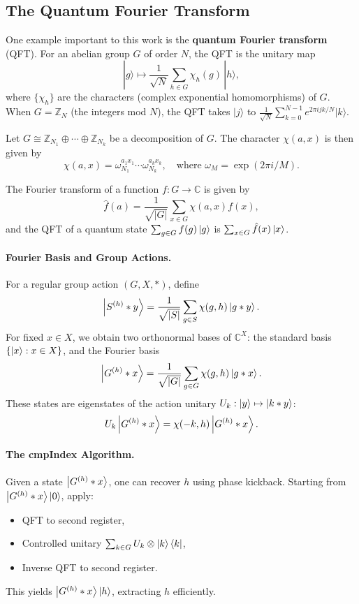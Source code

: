 \documentclass[12pt]{report}
\begin{document}
\subsection{The Quantum Fourier Transform}

One example important to this work is the \textbf{quantum Fourier transform} (QFT). For an abelian group $G$ of order $N$, the QFT is the unitary map
\[
|g\rangle \mapsto \frac{1}{\sqrt{N}}\sum_{h \in G} \chi_h(g)\, |h\rangle,
\]
where $\{\chi_h\}$ are the characters (complex exponential homomorphisms) of $G$. When $G = \mathbb{Z}_N$ (the integers mod $N$), the QFT takes $|j\rangle$ to $\frac{1}{\sqrt{N}}\sum_{k=0}^{N-1} e^{2\pi i j k / N} |k\rangle$. 

Let $G \cong \mathbb{Z}_{N_1} \oplus \cdots \oplus \mathbb{Z}_{N_k}$ be a decomposition of $G$. The character $\chi(a, x)$ is then given by
\[
\chi(a, x) = \omega_{N_1}^{a_1x_1} \cdots \omega_{N_k}^{a_kx_k}, \quad \text{where } \omega_M = \exp(2\pi i/ M).
\]

The Fourier transform of a function $f: G \to \mathbb{C}$ is given by
\[
\hat{f}(a) = \frac{1}{\sqrt{|G|}} \sum_{x \in G} \chi(a, x) f(x),
\]
and the QFT of a quantum state $\sum_{g \in G} f(g) \ket{g}$ is $\sum_{x \in G} \hat{f}(x) \ket{x}$.

\paragraph{Fourier Basis and Group Actions.} For a regular group action $(G, X, *)$, define
\[
\ket{S^{(h)} * y} = \frac{1}{\sqrt{|S|}} \sum_{g \in S} \chi(g, h) \ket{g * y}.
\]
For fixed $x \in X$, we obtain two orthonormal bases of $\mathbb{C}^X$: the standard basis $\{ \ket{x} : x \in X \}$, and the Fourier basis
\[
\ket{G^{(h)} * x} = \frac{1}{\sqrt{|G|}} \sum_{g \in G} \chi(g, h) \ket{g * x}.
\]
These states are eigenstates of the action unitary $U_k: \ket{y} \mapsto \ket{k * y}$:
\[
U_k \ket{G^{(h)} * x} = \chi(-k, h) \ket{G^{(h)} * x}.
\]

\paragraph{The cmpIndex Algorithm.}
Given a state $\ket{G^{(h)} * x}$, one can recover $h$ using phase kickback. Starting from $\ket{G^{(h)} * x} \ket{0}$, apply:
\begin{itemize}
    \item QFT to second register,
    \item Controlled unitary $\sum_{k \in G} U_k \otimes \ket{k}\bra{k}$,
    \item Inverse QFT to second register.
\end{itemize}
This yields $\ket{G^{(h)} * x} \ket{h}$, extracting $h$ efficiently.
\end{document}
